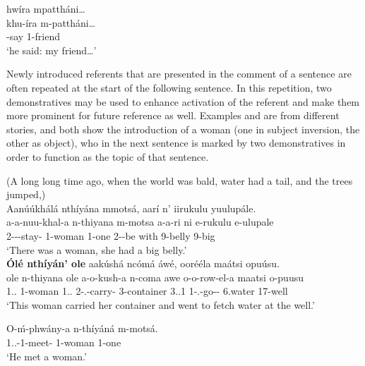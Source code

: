 \documentclass[output=paper]{langscibook}
\begin{document}
hwíra  mpattháni…\\
\gll
khu-íra  m-pattháni…\\
\NARR{}-say  1-friend\\
\glt
‘he said: my friend…’  \citep[201]{vanderWal2010}\\

\z

 Newly introduced referents that are presented in the comment of a sentence are often repeated at the start of the following sentence. In this repetition, two demonstratives may be used to enhance activation of the referent and make them more prominent for future reference as well. Examples  and  are from different stories, and both show the introduction of a woman (one in subject inversion, the other as object), who in the next sentence is marked by two demonstratives in order to function as the topic of that sentence.

\ea
\label{bkm:Ref117580101}
(A long long time ago, when the world was bald, water had a tail, and the trees jumped,)\\
Aanúúkhálá nthíyána mmotsá, aarí n’ iirukulu yuulupále.\\
\gll
a-a-nuu-khal-a  n-thiyana  m-motsa  a-a-ri  ni  e-rukulu  e-ulupale\\
2\SM{}-\PST{}-\PERS{}-stay-\FV{}  1-woman  1-one  2\SM{}-\PST{}-be  with  9-belly  9-big\\
\glt
‘There was a woman, she had a big belly.’\\

\sn
\textbf{Ólé nthíyán’ ole} aakúshá ncómá áwé, oorééla maátsi opuúsu.\\
\gll
ole  n-thiyana  ole  a-o-kush-a  n-coma  awe  o-o-row-el-a  maatsi  o-puusu\\
1.\DEM{}.\DIST{}  1-woman  1.\DEM{}.\DIST{}  2\SM{}-\PFV{}.\DJ{}-carry-\FV{}  3-container  3.\POSS{}.1  1\SM{}-\PFV{}.\DJ{}-go-\APPL{}-\FV{}  6.water  17-well\\
\glt ‘This woman carried her container and went to fetch water at the well.’

\z

\ea
\label{bkm:Ref96953104}
\gll
O-ḿ-phwány-a  n-thíyáná  m-motsá.\\
1\SM{}.\PFV{}.\DJ{}-1\OM{}-meet-\FV{}  1-woman  1-one\\
\glt
‘He met a woman.’\\
\end{document}
